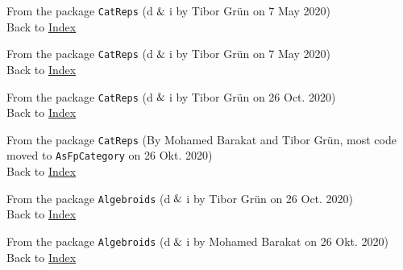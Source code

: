 
From the package \texttt{CatReps} (d$\And$i by Tibor Grün on 7 May 2020) \\
Back to \hyperref[lol]{Index}
		

From the package \texttt{CatReps} (d$\And$i by Tibor Grün on 7 May 2020) \\
Back to \hyperref[lol]{Index}
		

From the package \texttt{CatReps} (d$\And$i by Tibor Grün on 26 Oct. 2020) \\
Back to \hyperref[lol]{Index}


From the package \texttt{CatReps} (By Mohamed Barakat and Tibor Grün, most code moved to \texttt{AsFpCategory} on 26 Okt. 2020) \\
Back to \hyperref[lol]{Index}


From the package \texttt{Algebroids} (d$\And$i by Tibor Grün on 26 Oct. 2020) \\
Back to \hyperref[lol]{Index}


From the package \texttt{Algebroids} (d$\And$i by Mohamed Barakat on 26 Okt. 2020) \\
Back to \hyperref[lol]{Index}
		
